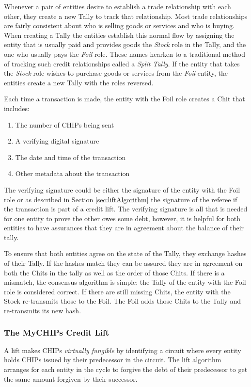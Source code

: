 \documentclass[runningheads]{llncs}
\newcommand{\secref}[1]{Section \ref{#1}}
\begin{document}
Whenever a pair of entities desire to establish a trade relationship with each other, they create a new Tally to track that relationship. Most trade relationships are fairly consistent about who is selling goods or services and who is buying. When creating a Tally the entities establish this normal flow by assigning the entity that is usually paid and provides goods the \emph{Stock} role in the Tally, and the one who usually pays the \emph{Foil} role. These names hearken to a traditional method of tracking such credit relationships called a \emph{Split Tally}. If the entity that takes the \emph{Stock} role wishes to purchase goods or services from the \emph{Foil} entity, the entities create a new Tally with the roles reversed.

Each time a transaction is made, the entity with the Foil role creates a Chit that includes: 
\begin{enumerate}
    \item The number of CHIPs being sent
    \item A verifying digital signature
    \item The date and time of the transaction
    \item Other metadata about the transaction
\end{enumerate}
The verifying signature could be either the signature of the entity with the Foil role or as described in \secref{sec:liftAlgorithm} the signature of the referee if the transaction is part of a credit lift. The verifying signature is all that is needed for one entity to prove the other owes some debt, however, it is helpful for both entities to have assurances that they are in agreement about the balance of their tally. 

To ensure that both entities agree on the state of the Tally, they exchange hashes of their Tally. If the hashes match they can be assured they are in agreement on both the Chits in the tally as well as the order of those Chits. If there is a mismatch, the consensus algorithm is simple: the Tally of the entity with the Foil role is considered correct. If there are still missing Chits, the entity with the Stock re-transmits those to the Foil. The Foil adds those Chits to the Tally and re-transmits its new hash. 

\subsubsection{The MyCHIPs Credit Lift}
A lift makes CHIPs \emph{virtually fungible} by identifying a circuit where every entity holds CHIPs issued by their predecessor in the circuit. The lift algorithm arranges for each entity in the cycle to forgive the debt of their predecessor to get the same amount forgiven by their successor. 
 
\end{document}
